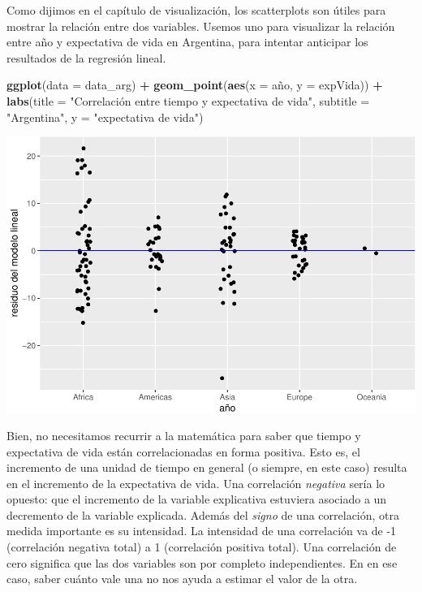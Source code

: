 \documentclass[]{book}
\newenvironment{Shaded}{\begin{snugshade}}{\end{snugshade}}
\newcommand{\KeywordTok}[1]{\textcolor[rgb]{0.13,0.29,0.53}{\textbf{#1}}}
\newcommand{\DataTypeTok}[1]{\textcolor[rgb]{0.13,0.29,0.53}{#1}}
\newcommand{\StringTok}[1]{\textcolor[rgb]{0.31,0.60,0.02}{#1}}
\newcommand{\OperatorTok}[1]{\textcolor[rgb]{0.81,0.36,0.00}{\textbf{#1}}}
\newcommand{\NormalTok}[1]{#1}
\begin{document}
Como dijimos en el capítulo de visualización, los scatterplots son
útiles para mostrar la relación entre dos variables. Usemos uno para
visualizar la relación entre año y expectativa de vida en Argentina,
para intentar anticipar los resultados de la regresión lineal.

\begin{Shaded}
\begin{Highlighting}[]
\KeywordTok{ggplot}\NormalTok{(}\DataTypeTok{data =}\NormalTok{ data_arg) }\OperatorTok{+}\StringTok{ }
\StringTok{    }\KeywordTok{geom_point}\NormalTok{(}\KeywordTok{aes}\NormalTok{(}\DataTypeTok{x =}\NormalTok{ año, }\DataTypeTok{y =}\NormalTok{ expVida)) }\OperatorTok{+}
\StringTok{    }\KeywordTok{labs}\NormalTok{(}\DataTypeTok{title =} \StringTok{"Correlación entre tiempo y expectativa de vida"}\NormalTok{,}
         \DataTypeTok{subtitle =} \StringTok{"Argentina"}\NormalTok{,}
         \DataTypeTok{y =} \StringTok{"expectativa de vida"}\NormalTok{)}
\end{Highlighting}
\end{Shaded}

\includegraphics{ciencia_de_datos_politicas_publicas_files/figure-latex/unnamed-chunk-109-1.pdf}

Bien, no necesitamos recurrir a la matemática para saber que tiempo y
expectativa de vida están correlacionadas en forma positiva. Esto es, el
incremento de una unidad de tiempo en general (o siempre, en este caso)
resulta en el incremento de la expectativa de vida. Una correlación
\emph{negativa} sería lo opuesto: que el incremento de la variable
explicativa estuviera asociado a un decremento de la variable explicada.
Además del \emph{signo} de una correlación, otra medida importante es su
intensidad. La intensidad de una correlación va de -1 (correlación
negativa total) a 1 (correlación positiva total). Una correlación de
cero significa que las dos variables son por completo independientes. En
en ese caso, saber cuánto vale una no nos ayuda a estimar el valor de la
otra.
\end{document}

